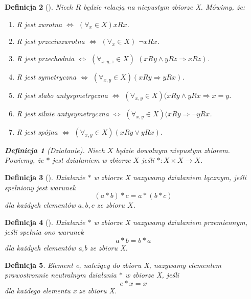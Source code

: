 \documentclass[12pt,a4paper]{report}
\newtheorem{definition}{Definicja}
\begin{document}
\begin{definition}[\citep{kraszewski2007wstkep}]
Niech $R$ będzie relacją na niepustym zbiorze X. Mówimy, że:
\begin{enumerate}
\item
R jest zwrotna $\Leftrightarrow$ $(\forall_{x}\in X) xRx$.
\item
R jest przeciwzwrotna $\Leftrightarrow$ $(\forall_{x}\in X)$ $\neg xRx$.
\item
R jest przechodnia $\Leftrightarrow$ $(\forall_{x,y,z}\in X)$ $(xRy\wedge yRz  \Rightarrow xRz)$.
\item
R jest symetryczna $\Leftrightarrow$ $(\forall_{x,y}\in X)(xRy \Rightarrow yRx)$. 
\item
R jest słabo antysymetryczna $\Leftrightarrow$ $(\forall_{x,y}\in X)( xRy \wedge yRx \Rightarrow x=y$.
\item
R jest silnie antysymetryczna $\Leftrightarrow$ $(\forall_{x,y}\in X)(xRy \Rightarrow \neg yRx$.
\item
R jest spójna $\Leftrightarrow$ $(\forall_{x,y}\in X)(xRy \vee yRx)$.

\end{enumerate}

\begin{definition}[Działanie]
Niech $X$ będzie dowolnym niepustym zbiorem. Powiemy, że $\ast$ jest działaniem w zbiorze $X$ jeśli $\ast: X \times X \to X$.
\end{definition}

\end{definition}
\begin{definition}[\citep{jedrzejewski2011algebra}]
Działanie $\ast$ w zbiorze X nazywamy działaniem łącznym, jeśli spełniony jest warunek 
\begin{equation*}
(a\ast b)\ast c = a\ast(b\ast c)
\end{equation*} 
dla każdych elementów $a,b,c$ ze zbioru $X$.
\end{definition}
\begin{definition}[\citep{jedrzejewski2011algebra}]
Działanie $\ast$ w zbiorze X nazywamy działaniem przemiennym, jeśli spełnia ono warunek
\begin{equation*}
a\ast b=b\ast a
\end{equation*}
dla każdych elementów a,b ze zbioru X.
\end{definition}
\begin{definition}
Element e, należący do zbioru X, nazywamy elementem prawostronnie neutralnym działania $\ast$ w zbiorze X, jeśli
\begin{equation*}
e\ast x = x
\end{equation*} 
dla każdego elementu x ze zbioru X.
\end{definition}
\end{document}
